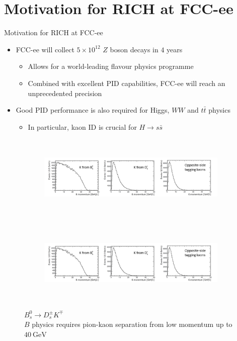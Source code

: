 \documentclass{beamer}
\begin{document}
\section{Motivation for RICH at FCC-ee}
\begin{frame}{Motivation for RICH at FCC-ee}
  \begin{itemize}
    \setlength\itemsep{0.7em}
    \item{FCC-ee will collect $5\times 10^{12}$ $Z$ boson decays in $4$ years}
    \begin{itemize}
      \item{Allows for a world-leading flavour physics programme}
      \item{Combined with excellent PID capabilities, FCC-ee will reach an unprecedented precision}
    \end{itemize}
    \item{Good PID performance is also required for Higgs, $WW$ and $t\bar{t}$ physics}
    \begin{itemize}
      \item{In particular, kaon ID is crucial for $H\to s\bar{s}$}
    \end{itemize}
  \end{itemize}
  \begin{figure}
    \centering
    \vspace{-0.2cm}
    \begin{subfigure}{0.5\textwidth}
      \includegraphics[height = 4cm, trim = {0 0 22.5cm 0}, clip = true]{Plots/p_spectrum_crop.png}
    \end{subfigure}%
    \begin{subfigure}{0.5\textwidth}
      \includegraphics[height = 4cm, trim = {22.0cm 0 0 0}, clip = true]{Plots/p_spectrum_crop.png}
    \end{subfigure}
    \caption{$B_s^0\to D_s^\pm K^\mp$\\$B$ physics requires pion-kaon separation from low momentum up to $\SI{40}{\giga\eV}$}
  \end{figure}
\end{frame}
\end{document}
